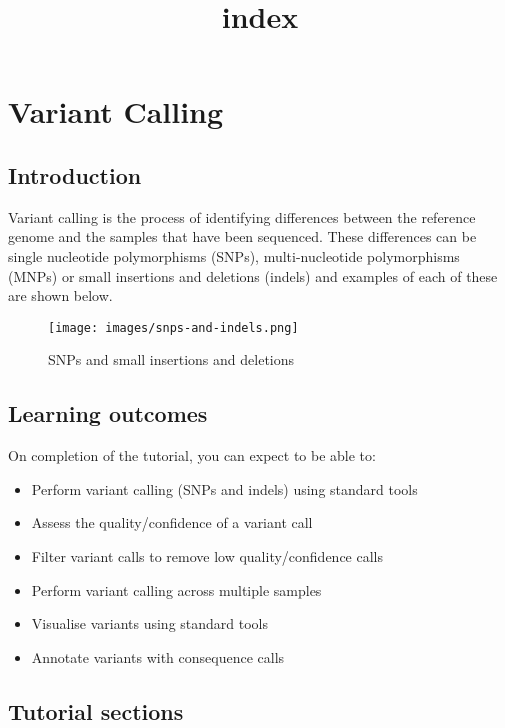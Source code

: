 \documentclass[11pt]{article}
\title{index}
\providecommand{\tightlist}{%
      \setlength{\itemsep}{0pt}\setlength{\parskip}{0pt}}
\begin{document}
    \hypertarget{variant-calling}{%
\section{Variant Calling}\label{variant-calling}}

\hypertarget{introduction}{%
\subsection{Introduction}\label{introduction}}

Variant calling is the process of identifying differences between the
reference genome and the samples that have been sequenced. These
differences can be single nucleotide polymorphisms (SNPs),
multi-nucleotide polymorphisms (MNPs) or small insertions and deletions
(indels) and examples of each of these are shown below.

    \begin{figure}
\centering
\texttt{[image: images/snps-and-indels.png]}
\caption{SNPs and small insertions and deletions}
\end{figure}

    \hypertarget{learning-outcomes}{%
\subsection{Learning outcomes}\label{learning-outcomes}}

On completion of the tutorial, you can expect to be able to:

\begin{itemize}
\tightlist
\item
  Perform variant calling (SNPs and indels) using standard tools
\item
  Assess the quality/confidence of a variant call
\item
  Filter variant calls to remove low quality/confidence calls
\item
  Perform variant calling across multiple samples
\item
  Visualise variants using standard tools
\item
  Annotate variants with consequence calls
\end{itemize}

\hypertarget{tutorial-sections}{%
\subsection{Tutorial sections}\label{tutorial-sections}}
\end{document}
